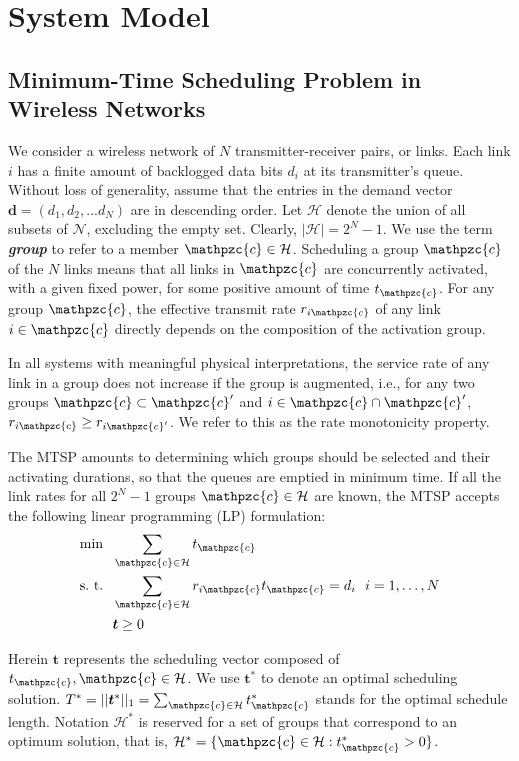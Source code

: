 \documentclass[10pt,onecolumn,journal,draftcls,oneside]{IEEEtran}
\newcommand{\CN}{\mathcal{N}}
\newcommand{\CH}{\mathcal{H}}
\newcommand{\Cc}{\mathpzc{c}}
\newcommand{\Bd}{\boldsymbol{d}}
\newcommand{\Bt}{\boldsymbol{t}}
\begin{document}
\section{System Model}
\label{sec:system}
\subsection{Minimum-Time Scheduling Problem in Wireless Networks}
We consider a wireless network of $N$ transmitter-receiver pairs, or links. Each link $i$ has a finite amount of backlogged data bits $d_i$ at its transmitter's queue. Without loss of generality, assume that the entries in the demand vector $\Bd = (d_1,d_2, ... d_N)$ are in descending order. Let $\CH$ denote the union of all subsets of $\CN$, excluding the empty set. Clearly, $|\CH| = 2^N-1$. We use the term {\bf\emph{group}} to refer to a member $\Cc \in \CH$. Scheduling a group $\Cc$ of the $N$ links means that all links in $\Cc$ are concurrently activated, with a given fixed power, for some positive amount of time $t_\Cc$. For any group $\Cc$, the effective transmit rate $r_{i\Cc}$ of any link $i \in \Cc$ directly depends on the composition of the activation group. 

In all systems with meaningful physical interpretations, the service rate of any link in a group does not increase if the group is augmented, i.e., for any two groups $\Cc \subset \Cc'$ and $i \in \Cc \cap \Cc'$, $r_{i\Cc} \geq r_{i\Cc'}$. We refer to this as the rate monotonicity property.

The MTSP amounts to determining which groups should be selected and their activating durations, so that the queues are emptied in minimum time.
If all the link rates for all $2^N-1$ groups $\Cc \in \CH$ are known, the MTSP accepts the following linear programming (LP) formulation:
\begin{subequations}
\label{eq:lp}
\begin{align}
\min~~ & \sum_{\Cc \in \CH} t_\Cc \label{eq:lpobj}\\
\text{s.~t.}~~ & \sum_{\Cc \in \CH} r_{i\Cc} t_\Cc = d_i ~~i=1, \dots, N \label{eq:lpcons} \\
& \Bt \geq 0
\end{align}
\end{subequations}

Herein $\Bt$ represents the scheduling vector composed of $t_\Cc, \Cc \in \CH$. We use $\Bt^*$ to denote an optimal scheduling solution. $T^* = ||\Bt^*||_1 = \sum_{\Cc \in \CH}t^*_{\Cc}$ stands for the optimal schedule length. Notation $\CH^*$ is reserved for a set of groups that correspond to an optimum solution, that is, $\CH^* = \{\Cc \in \CH: t^*_{\Cc} > 0\}$. 
\end{document}
